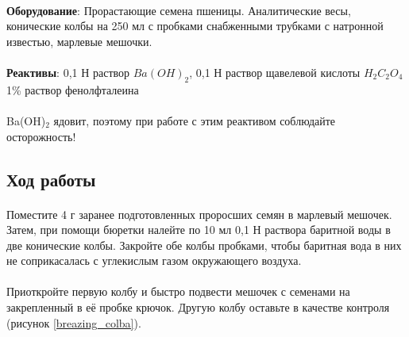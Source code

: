 \begin{footnotesize}

\paragraph*{}\textbf{Оборудование}: Прорастающие семена пшеницы. Аналитические весы, конические колбы на 250 мл с пробками снабженными трубками с натронной известью, марлевые мешочки. 

\paragraph*{}\textbf{Реактивы}: 0,1 Н раствор $Ba(OH)_2$, 0,1 Н раствор щавелевой кислоты $H{_2}C{_2}O{_4}$ 1\% раствор фенолфталеина

\end{footnotesize}

\paragraph*{\warningsign}Ba(OH)$_2$ ядовит, поэтому при работе с этим реактивом соблюдайте осторожность!

\subsection*{Ход работы}

\paragraph*{}Поместите 4 г заранее подготовленных проросших семян в марлевый мешочек. Затем, при помощи бюретки налейте по 10 мл 0,1 Н раствора баритной воды в две конические колбы. Закройте обе колбы пробками, чтобы баритная вода в них не соприкасалась с углекислым газом окружающего воздуха. 

\paragraph*{}Приоткройте первую колбу и быстро подвести мешочек с семенами на закрепленный в её пробке крючок. Другую колбу оставьте в качестве контроля (рисунок \ref{breazing_colba}). 

